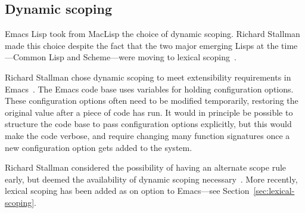\documentclass[format=acmsmall, review]{acmart}
\newcommand \Elisp {Emacs Lisp}
\begin{document}
\subsection{Dynamic scoping}

\Elisp{} took from MacLisp the choice of dynamic scoping.  Richard
Stallman made this choice despite the fact that the two major emerging
Lisps at the time---Common Lisp and Scheme---were moving to lexical
scoping~\cite{CLtL1,R2RS}.

Richard Stallman chose dynamic scoping to meet extensibility
requirements in Emacs~\cite{Stallman1981}.  The Emacs code base uses
variables for holding configuration options.  These configuration
options often need to be modified temporarily, restoring the original
value after a piece of code has run.  It would in principle be
possible to structure the code base to pass configuration options
explicitly, but this would make the code verbose, and require changing
many function signatures once a new configuration option gets added to
the system.

Richard Stallman considered the possibility of having an alternate
scope rule early, but deemed the availability of dynamic scoping
necessary~\cite{Stallman1981}.  More recently, lexical scoping has
been added as on option to Emacs---see
Section~\ref{sec:lexical-scoping}.

\end{document}

